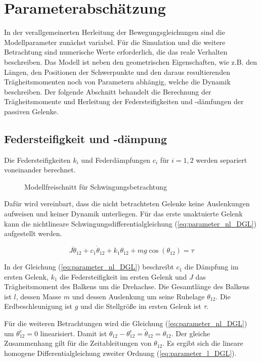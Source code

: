 \newpage
\section{Parameterabschätzung}

In der verallgemeinerten Herleitung der Bewegungsgleichungen sind die Modellparameter zunächst variabel. Für die Simulation und die weitere Betrachtung sind numerische Werte erforderlich, die das reale Verhalten beschreiben. Das Modell ist neben den geometrischen Eigenschaften, wie z.B. den Längen, den Positionen der Schwerpunkte und den daraus resultierenden Trägheitsmomenten noch von Parametern abhängig, welche die Dynamik beschreiben. Der folgende Abschnitt behandelt die Berechnung der Trägheitsmomente und Herleitung der Federsteifigkeiten und -dämfungen der passiven Gelenke.

\subsection{Federsteifigkeit und -dämpung}

Die Federsteifigkeiten $k_i$ und Federdämpfungen $c_i$ für $i=1,2$ werden separiert voneinander berechnet. 

\begin{figure}[h]
	\centering
	
	\caption[Modellparameter]{Modellfreischnitt für Schwingungsbetrachtung}
	\label{fig:parameter_abschaetung}
\end{figure}

Dafür wird vereinbart, dass die nicht betrachteten Gelenke keine Auslenkungen aufweisen und keiner Dynamik unterliegen. 
Für das erste unaktuierte Gelenk kann die nichtlineare Schwingungsdifferentialgleichung (\ref{eq:parameter_nl_DGL}) aufgestellt werden. 

\begin{equation} \label{eq:parameter_nl_DGL}
J\ddot{\theta}_{12}+c_1\dot{\theta}_{12}+k_1\theta_{12}+mg\cos(\theta_{12})=\tau
\end{equation}

In der Gleichung (\ref{eq:parameter_nl_DGL}) beschreibt $c_1$ die Dämpfung im ersten Gelenk, $k_1$ die Federsteifigkeit im ersten Gelenk und $J$ das Trägheitsmoment des Balkens um die Drehachse. Die Gesamtlänge des Balkens ist $l$, dessen Masse $m$ und dessen Auslenkung um seine Ruhelage $\theta_{12}$. Die Erdbeschleunigung ist $g$ und die Stellgröße im ersten Gelenk ist $\tau$.

Für die weiteren Betrachtungen wird die Gleichung (\ref{eq:parameter_nl_DGL}) um $\theta_{12}^e=0$ linearisiert. Damit ist $\theta_{12}-\theta_{12}^e=\tilde{\theta}_{12}=\theta_{12}$. Der gleiche Zusammenhang gilt für die Zeitableitungen von $\theta_{12}$. Es ergibt sich die lineare homogene Differentialgleichung zweiter Ordnung (\ref{eq:parameter_l_DGL}).

